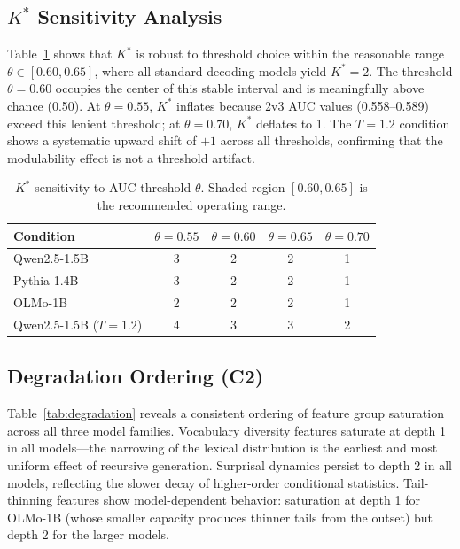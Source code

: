 \documentclass[11pt,a4paper]{article}
\begin{document}
\subsection{$K^*$ Sensitivity Analysis}
\label{sec:sensitivity}

Table~\ref{tab:sensitivity} shows that $K^*$ is robust to threshold choice within the reasonable range $\theta \in [0.60, 0.65]$, where all standard-decoding models yield $K^*{=}2$. The threshold $\theta{=}0.60$ occupies the center of this stable interval and is meaningfully above chance (0.50). At $\theta{=}0.55$, $K^*$ inflates because 2v3 AUC values (0.558--0.589) exceed this lenient threshold; at $\theta{=}0.70$, $K^*$ deflates to 1. The $T{=}1.2$ condition shows a systematic upward shift of $+1$ across all thresholds, confirming that the modulability effect is not a threshold artifact.

\begin{table}[t]
\centering
\small
\caption{$K^*$ sensitivity to AUC threshold $\theta$. Shaded region $[0.60, 0.65]$ is the recommended operating range.}
\label{tab:sensitivity}
\begin{tabular}{@{}lcccc@{}}
\toprule
\textbf{Condition} & $\theta{=}0.55$ & $\theta{=}0.60$ & $\theta{=}0.65$ & $\theta{=}0.70$ \\
\midrule
Qwen2.5-1.5B & 3 & 2 & 2 & 1 \\
Pythia-1.4B & 3 & 2 & 2 & 1 \\
OLMo-1B & 2 & 2 & 2 & 1 \\
Qwen2.5-1.5B ($T{=}1.2$) & 4 & 3 & 3 & 2 \\
\bottomrule
\end{tabular}
\end{table}

\subsection{Degradation Ordering (C2)}
\label{sec:ordering}

Table~\ref{tab:degradation} reveals a consistent ordering of feature group saturation across all three model families. Vocabulary diversity features saturate at depth 1 in all models---the narrowing of the lexical distribution is the earliest and most uniform effect of recursive generation. Surprisal dynamics persist to depth 2 in all models, reflecting the slower decay of higher-order conditional statistics. Tail-thinning features show model-dependent behavior: saturation at depth 1 for OLMo-1B (whose smaller capacity produces thinner tails from the outset) but depth 2 for the larger models.
\end{document}
